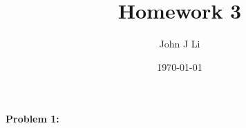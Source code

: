 \documentclass{article}
\title{Homework 3}
\date{\today}
\author{John J Li}
\begin{document}
    \maketitle
    \newpage


    \textbf{Problem 1:}

\end{document}
